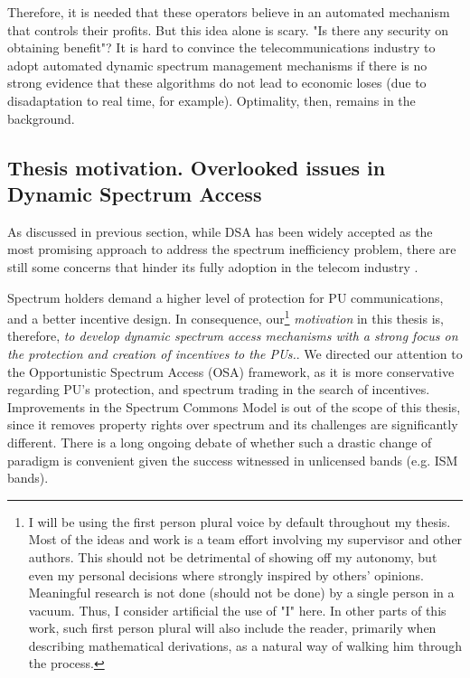 Therefore, it is needed that these operators believe in an automated mechanism that controls their profits. But this idea alone is scary. "Is there any security on obtaining benefit"? It is hard to convince the telecommunications industry to adopt automated dynamic spectrum management mechanisms if there is no strong evidence that these algorithms do not lead to economic loses (due to disadaptation to real time, for example). Optimality, then, remains in the background.

\subsection{Thesis motivation. Overlooked issues in Dynamic Spectrum Access}

As discussed in previous section, while DSA has been widely accepted as the most promising approach to address the spectrum inefficiency problem, there are still some concerns that hinder its fully adoption in the telecom industry \cite{ref:Kelly2012}.

Spectrum holders demand a higher level of protection for PU communications, and a better incentive design. In consequence, our\footnote{I will be using the first person plural voice by default throughout my thesis. Most of the ideas and work is a team effort involving my supervisor and other authors. This should not be detrimental of showing off my autonomy, but even my personal decisions where strongly inspired by others' opinions. Meaningful research is not done (should not be done) by a single person in a vacuum. Thus, I consider artificial the use of "I" here. In other parts of this work, such first person plural will also include the reader, primarily when describing mathematical derivations, as a natural way of walking him through the process.} \emph{motivation} in this thesis is, therefore, \emph{to develop dynamic spectrum access mechanisms with a strong focus on the protection and creation of incentives to the PUs.}. We directed our attention to the Opportunistic Spectrum Access (OSA) framework, as it is more conservative regarding PU's protection, and spectrum trading in the search of incentives.
Improvements in the Spectrum Commons Model is out of the scope of this thesis, since it removes property rights over spectrum and its challenges are significantly different. There is a long ongoing debate of whether such a drastic change of paradigm is convenient \cite{ref:Peha2005} given the success witnessed in unlicensed bands (e.g. ISM bands).

